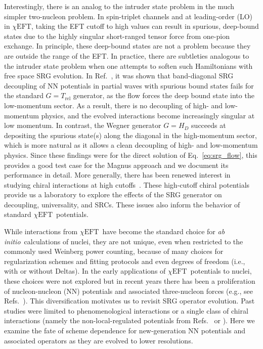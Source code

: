 \documentclass[10pt,aps,prc,floatfix,twocolumn,nofootinbib]{revtex4-1}
\newcommand{\chiEFT}{\ensuremath{\chi{\textrm{EFT}}}}
\newcommand{\Trel}{\ensuremath{T_{\textrm{rel}}}}
\newcommand{\abi}{\textit{ab initio}}
\begin{document}
Interestingly, there is an analog to the intruder state problem in the much simpler two-nucleon problem.
In spin-triplet channels and at leading-order (LO) in \chiEFT, taking the EFT cutoff to high values can result in spurious, deep-bound states due to the highly singular short-ranged tensor force from one-pion exchange. 
In principle, these deep-bound states are not a problem because they are outside the range of the EFT.
In practice, there are subtleties analogous to the intruder state problem when one attempts to soften such Hamiltonians with free space SRG evolution.
In Ref.~\cite{Wendt:2011qj}, it was shown that band-diagonal SRG decoupling of NN potentials in partial waves with spurious bound states fails for the standard $G=\Trel$ generator, as the flow forces the deep bound state into the low-momentum sector.
As a result, there is no decoupling of high- and low-momentum physics, and the evolved interactions become increasingly singular at low momentum.
In contrast, the Wegner generator $G=H_{D}$ succeeds at depositing the spurious state(s) along the diagonal in the high-momentum sector, which is more natural as it allows a clean decoupling of high- and low-momentum physics. 
Since these findings were for the direct solution of Eq.~\eqref{eq:srg_flow}, this  provides a good test case for the Magnus approach and we document its performance in detail.
More generally, there has been renewed interest in studying chiral interactions at high cutoffs~\cite{Tews:2018sbi}. 
These high-cutoff chiral potentials provide us a laboratory to explore the effects of the SRG generator on decoupling, universality, and SRCs.
These issues also inform the behavior of standard \chiEFT\ potentials.


While interactions from \chiEFT\ have become the standard choice for \abi\ calculations of nuclei, they are not unique, even when restricted to the commonly used Weinberg power counting, because of many choices for regularization schemes and fitting protocols and even degrees of freedom (i.e., with or without Deltas).
In the early applications of \chiEFT\ potentials to nuclei, these choices were not explored but in recent years there has been a proliferation of nucleon-nucleon (NN) potentials and associated three-nucleon forces (e.g., see Refs.~\cite{Epelbaum:2014efa,Gezerlis:2014zia,Piarulli:2014bda,Ekstrom:2015rta,Carlsson:2015vda,Reinert:2017usi,Ekstrom:2017koy,Entem:2017gor}).
This diversification motivates us to revisit SRG operator evolution.
Past studies were limited to phenomenological interactions or a single class of chiral interactions (namely the non-local-regulated potentials from Refs.~\cite{Entem:2003ft} or \cite{Epelbaum:2004fk}).
Here we examine the fate of scheme dependence for new-generation NN potentials and associated operators as they are evolved to lower resolutions.
\end{document}

